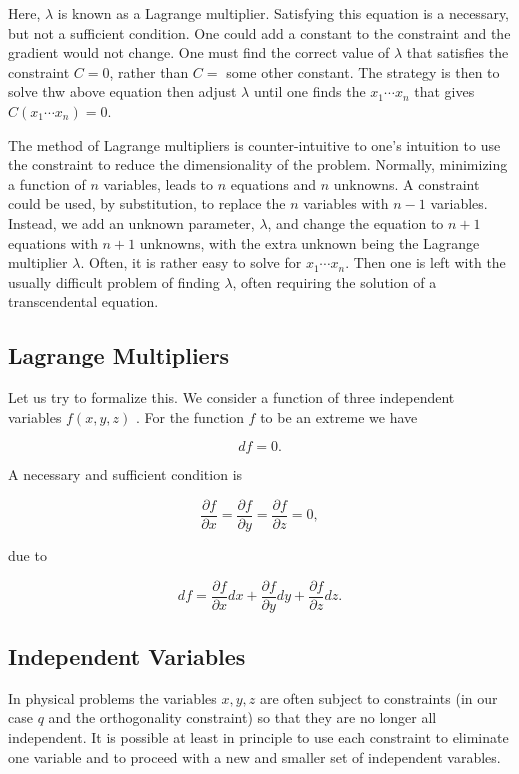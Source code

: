 \documentclass[%
oneside,                 %
final,                   %
10pt]{article}
\begin{document}
Here, $\lambda$ is known as a Lagrange multiplier. Satisfying
this equation  is a necessary, but not a sufficient
condition. One could add a constant to the constraint and the gradient
would not change. One must find the correct value of $\lambda$ that
satisfies the constraint $C=0$, rather than $C=$ some other
constant. The strategy is then to solve
thw above equation  then adjust $\lambda$ until one
finds the $x_1\cdots x_n$ that gives $C(x_1\cdots x_n)=0$.

The method of Lagrange multipliers is counter-intuitive to one's
intuition to use the constraint to reduce the dimensionality of the
problem. Normally, minimizing a function of $n$ variables, leads to
$n$ equations and $n$ unknowns. A constraint could be used, by
substitution, to replace the $n$ variables with $n-1$
variables. Instead, we add an unknown parameter, $\lambda$, and change
the equation to $n+1$ equations with $n+1$ unknowns, with the extra
unknown being the Lagrange multiplier $\lambda$. Often, it is rather
easy to solve for $x_1\cdots x_n$. Then one is left with the usually
difficult problem of finding $\lambda$, often requiring the solution
of a transcendental equation.

\subsection{Lagrange Multipliers}

Let us try to formalize this. We consider a function of three independent variables $f(x,y,z)$ . For
the function $f$ to be an extreme we have

\[
df=0.
\]

A necessary and sufficient condition is

\[
\frac{\partial f}{\partial x} =\frac{\partial f}{\partial y}=\frac{\partial f}{\partial z}=0,
\]

due to

\[
df = \frac{\partial f}{\partial x}dx+\frac{\partial f}{\partial y}dy+\frac{\partial f}{\partial z}dz.
\]

\subsection{Independent Variables}

In physical problems the variables $x,y,z$ are often subject to constraints (in our case $q$ and the orthogonality constraint)
so that they are no longer all independent. It is possible at least in principle to use each constraint to eliminate one variable
and to proceed with a new and smaller set of independent varables.
\end{document}
